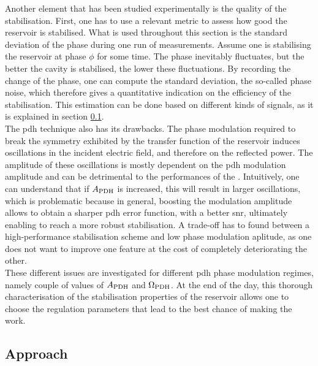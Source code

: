 Another element that has been studied experimentally is the quality of the stabilisation. First, one has to use a relevant metric to assess how good the reservoir is stabilised. What is used throughout this section is the standard deviation of the phase during one run of measurements. Assume one is stabilising the reservoir at phase $\phi$ for some time. The phase inevitably fluctuates, but the better the cavity is stabilised, the lower these fluctuations. By recording the change of the phase, one can compute the standard deviation, the so-called phase noise, which therefore gives a quantitative indication on the efficiency of the stabilisation. This estimation can be done based on different kinds of signals, as it is explained in section \ref{subsec-approach}.\\

The \gls{pdh} technique also has its drawbacks. The phase modulation required to break the symmetry exhibited by the transfer function of the reservoir induces oscillations in the incident electric field, and therefore on the reflected power. The amplitude of these oscillations is mostly dependent on the \gls{pdh} modulation amplitude and can be detrimental to the performances of the \rcer. Intuitively, one can understand that if $A_{\text{PDH}}$ is increased, this will result in larger oscillations, which is problematic because in general, boosting the modulation amplitude allows to obtain a sharper \gls{pdh} error function, with a better \gls{snr}, ultimately enabling to reach a more robust stabilisation. A trade-off has to found between a high-performance stabilisation scheme and low \pdh phase modulation aplitude, as one does not want to improve one feature at the cost of completely deteriorating the other.\\

These different issues are investigated for different \gls{pdh} phase modulation regimes, namely couple of values of $A_{\text{PDH}}$ and $\Omega_{\text{PDH}}$. At the end of the day, this thorough characterisation of the stabilisation properties of the reservoir allows one to choose the regulation parameters that lead to the best chance of making the \rcer work.


\subsection{Approach}

\label{subsec-approach}

